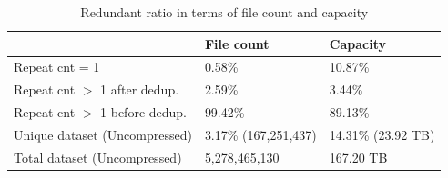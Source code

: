 \begin{table} 
	\centering 
	\scriptsize  
	\caption{Redundant ratio in terms of file count and capacity}
	\label{tbl:overall-redundant_ratio} 
	\begin{tabular}{|l|l|l|}%
		\hline  
		& File count & Capacity \\ 
		\hline 
		Repeat cnt = 1 & 0.58\% & 10.87\%\\
		\hline 
		Repeat cnt $>$ 1 after dedup. & 2.59\% & 3.44\%\\ 
		\hline 
		Repeat cnt $>$ 1 before dedup.  & 99.42\%  & 89.13\%\\ 
		\hline 
		Unique dataset (Uncompressed) & 3.17\% (167,251,437)  &  14.31\% (23.92 TB) \\ 
		\hline 
		Total dataset (Uncompressed) & 5,278,465,130 & 167.20 TB \\ \hline 	
	\end{tabular} 
\end{table} 


